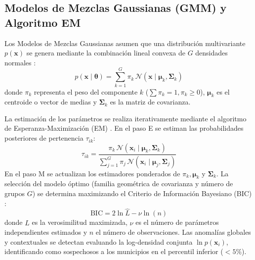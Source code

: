 \documentclass[11pt,a4paper]{article}
\begin{document}
\subsection{Modelos de Mezclas Gaussianas (GMM) y Algoritmo EM}
Los Modelos de Mezclas Gaussianas asumen que una distribución multivariante $p(\mathbf{x})$ se genera mediante la combinación lineal convexa de $G$ densidades normales \citep{scrucca2016mclust}:
\begin{equation}
    p(\mathbf{x} \mid \boldsymbol{\theta}) = \sum_{k=1}^{G} \pi_k \, \mathcal{N}(\mathbf{x} \mid \boldsymbol{\mu}_k, \boldsymbol{\Sigma}_k)
\end{equation}
donde $\pi_k$ representa el peso del componente $k$ ($\sum \pi_k = 1, \pi_k \ge 0$), $\boldsymbol{\mu}_k$ es el centroide o vector de medias y $\boldsymbol{\Sigma}_k$ es la matriz de covarianza.

La estimación de los parámetros se realiza iterativamente mediante el algoritmo de Esperanza-Maximización (EM) \citep{dempster1977em}. En el paso E se estiman las probabilidades posteriores de pertenencia $\tau_{ik}$:
\begin{equation}
    \tau_{ik} = \frac{\pi_k \, \mathcal{N}(\mathbf{x}_i \mid \boldsymbol{\mu}_k, \boldsymbol{\Sigma}_k)}{\sum_{j=1}^G \pi_j \, \mathcal{N}(\mathbf{x}_i \mid \boldsymbol{\mu}_j, \boldsymbol{\Sigma}_j)}
\end{equation}
En el paso M se actualizan los estimadores ponderados de $\pi_k, \boldsymbol{\mu}_k$ y $\boldsymbol{\Sigma}_k$. La selección del modelo óptimo (familia geométrica de covarianza y número de grupos $G$) se determina maximizando el Criterio de Información Bayesiano (BIC) \citep{raftery1995bic}:
\begin{equation}
    \text{BIC} = 2 \ln \hat{L} - \nu \ln(n)
\end{equation}
donde $\hat{L}$ es la verosimilitud maximizada, $\nu$ es el número de parámetros independientes estimados y $n$ el número de observaciones. Las anomalías globales y contextuales se detectan evaluando la log-densidad conjunta $\ln p(\mathbf{x}_i)$, identificando como sospechosos a los municipios en el percentil inferior ($< 5\%$).
\end{document}
